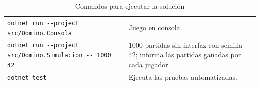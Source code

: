 \begin{table}[H]
\caption{Comandos para ejecutar la solución}\label{tab:comandos}
\tablacompacta
\begin{tabularx}{\textwidth}{@{}L{9.6cm}Y@{}}
  \toprule
   &  \\ \midrule
  \texttt{dotnet run -{}-project src/Domino.Consola} & Juego en consola. \\ \filasep
  \texttt{dotnet run -{}-project src/Domino.Simulacion -{}- 1000 42} & 1000 partidas sin interfaz con semilla 42; informa las partidas ganadas por cada jugador. \\ \filasep
  \texttt{dotnet test} & Ejecuta las pruebas automatizadas. \\
  \bottomrule
\end{tabularx}
\end{table}
